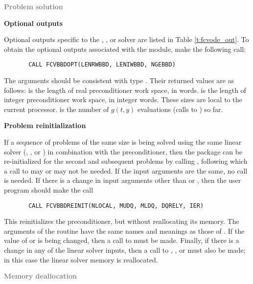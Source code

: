 \begin{Steps}
\item \textcolor{gray}{\bf Problem solution}
  
\item {\bf {\cvbbdpre} Optional outputs}
  
  Optional outputs specific to the {\spgmr}, {\spbcg}, or {\sptfqmr} solver are 
  listed in Table \ref{t:fcvode_out}.
  To obtain the optional outputs associated with the {\cvbbdpre} module, make
  the following call:
\begin{verbatim}
       CALL FCVBBDOPT(LENRWBBD, LENIWBBD, NGEBBD)
\end{verbatim}
  The arguments should be consistent with {\C} type .  Their
  returned values are as follows:
   is the length of real preconditioner work space, in 
  words.  is the length of integer preconditioner work space, in
  integer words.  These sizes are local to the current processor.
   is the number of $g(t,y)$ evaluations (calls to ) so far.
  
\item {\bf Problem reinitialization}
  
  If a sequence of problems of the same size is being solved using the same
  linear solver ({\spgmr}, {\spbcg}, or {\sptfqmr})  in combination with the
  {\cvbbdpre} preconditioner, then the {\cvode} package can be re-initialized
  for the second and subsequent problems by calling ,
  following which a call to  may or may not be needed.
  If the input arguments are the same, no  call is needed.
  If there is a change in input arguments other than  or ,
  then the user program should make the call 
\begin{verbatim}
       CALL FCVBBDREINIT(NLOCAL, MUDQ, MLDQ, DQRELY, IER)
\end{verbatim}
  This reinitializes the {\cvbbdpre} preconditioner, but without
  reallocating its memory.  The arguments of the 
  routine have the same names and meanings as those of .
  If the value of  or  is being changed, then a call to
   must be made.  Finally, if there is a change in any of the
  linear solver inputs, then a call to , , or
   must also be made; in this case the linear solver memory is
  reallocated.
  
\item \textcolor{gray}{\bf Memory deallocation}


\end{Steps}
